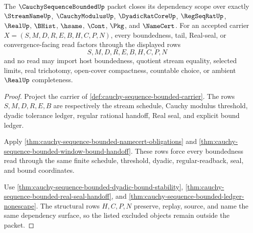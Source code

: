 \begin{theorem}\label{thm:cauchysequencebounded-scoped-dependency-surface}
The $\CauchySequenceBoundedUp$ packet closes its dependency scope over exactly $\StreamNameUp$, $\CauchyModulusUp$, $\DyadicRatCoreUp$, $\RegSeqRatUp$, $\RealUp$, $\BHist$, $\hsame$, $\Cont$, $\Pkg$, and $\NameCert$. For an accepted carrier $X=(S,M,D,R,E,B,H,C,P,N)$, every boundedness, tail, Real-seal, or convergence-facing read factors through the displayed rows
$$
S,M,D,R,E,B,H,C,P,N
$$
and no read may import host boundedness, quotient stream equality, selected limits, real trichotomy, open-cover compactness, countable choice, or ambient $\RealUp$ completeness.
\end{theorem}
\begin{proof}
Project the carrier of \autoref{def:cauchy-sequence-bounded-carrier}. The rows $S,M,D,R,E,B$ are respectively the stream schedule, Cauchy modulus threshold, dyadic tolerance ledger, regular rational handoff, Real seal, and explicit bound ledger.

Apply \autoref{thm:cauchy-sequence-bounded-namecert-obligations} and \autoref{thm:cauchy-sequence-bounded-window-bound-handoff}. These rows force every boundedness read through the same finite schedule, threshold, dyadic, regular-readback, seal, and bound coordinates.

Use \autoref{thm:cauchy-sequence-bounded-dyadic-bound-stability}, \autoref{thm:cauchy-sequence-bounded-real-seal-handoff}, and \autoref{thm:cauchy-sequence-bounded-ledger-nonescape}. The structural rows $H,C,P,N$ preserve, replay, source, and name the same dependency surface, so the listed excluded objects remain outside the packet.
\end{proof}

